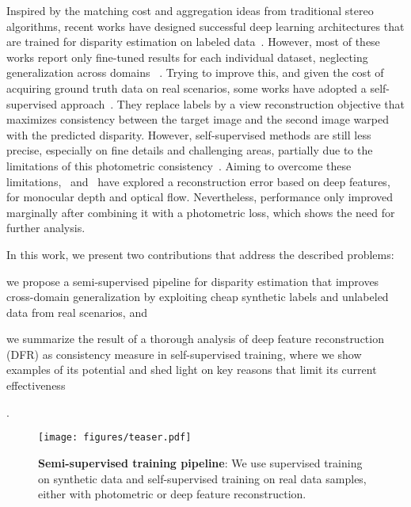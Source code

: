 \documentclass[final]{cvpr}
\begin{document}
Inspired by the matching cost and aggregation ideas from traditional stereo algorithms, recent works have designed successful deep learning architectures that are trained for disparity estimation on labeled data~\cite{mayer2016large, kendall2017end, guo2019gwc, cheng2020hierarchical, tankovich2020hitnet}. 
However, most of these works report only fine-tuned results for each individual dataset, neglecting generalization across domains ~\cite{kendall2017end, guo2019gwc, cheng2020hierarchical}.
Trying to improve this, and given the cost of acquiring ground truth data on real scenarios, some works have adopted a self-supervised approach~\cite{zhou2017unsupervised, yang2018segstereo, zhang2019dispsegnet, aleotti2020reversing}. They replace labels by a view reconstruction objective that maximizes consistency between the target image and the second image warped with the predicted disparity.
However, self-supervised methods are still less precise, especially on fine details and challenging areas, partially due to the limitations of this photometric consistency~\cite{jonschkowski2020unsupof}.
Aiming to overcome these limitations,~\cite{Zhan_2018_CVPR, shu2020feature} and~\cite{im2020unsupervised} have explored a reconstruction error based on deep features, for monocular depth and optical flow. 
Nevertheless, performance only improved marginally after combining it with a photometric loss, which shows the need for further analysis.

In this work, we present two contributions that address the described problems: \begin{enumerate*}[label=(\arabic*)] \item we propose a semi-supervised pipeline for disparity estimation that improves cross-domain generalization by exploiting cheap synthetic labels and unlabeled data from real scenarios, and \item we summarize the result of a thorough analysis of deep feature reconstruction (DFR) as consistency measure in self-supervised training, where we show examples of its potential and shed light on key reasons that limit its current effectiveness\end{enumerate*}.


\begin{figure}[t]
\begin{center}
\texttt{[image: figures/teaser.pdf]}
\end{center}
   \caption{{\bf Semi-supervised training pipeline}: We use supervised training on synthetic data and self-supervised training on real data samples, either with photometric or deep feature reconstruction.} 
\label{fig:teaser}
\end{figure}
\end{document}
